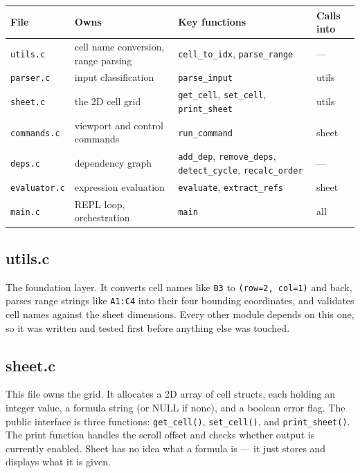 \documentclass[11pt,a4paper]{article}
\begin{document}
\begin{center}
\renewcommand{\arraystretch}{1.3}
\begin{tabular}{llll}
\toprule
\textbf{File} & \textbf{Owns} & \textbf{Key functions} & \textbf{Calls into} \\
\midrule
\texttt{utils.c}     & cell name conversion, range parsing  & \texttt{cell\_to\_idx}, \texttt{parse\_range}       & --- \\
\texttt{parser.c}    & input classification                 & \texttt{parse\_input}                               & utils \\
\texttt{sheet.c}     & the 2D cell grid                     & \texttt{get\_cell}, \texttt{set\_cell}, \texttt{print\_sheet} & utils \\
\texttt{commands.c}  & viewport and control commands        & \texttt{run\_command}                               & sheet \\
\texttt{deps.c}      & dependency graph                     & \texttt{add\_dep}, \texttt{remove\_deps}, \texttt{detect\_cycle}, \texttt{recalc\_order} & --- \\
\texttt{evaluator.c} & expression evaluation                & \texttt{evaluate}, \texttt{extract\_refs}           & sheet \\
\texttt{main.c}      & REPL loop, orchestration             & \texttt{main}                                       & all \\
\bottomrule
\end{tabular}
\end{center}

\subsection{utils.c}

The foundation layer. It converts cell names like \texttt{B3} to \texttt{(row=2, col=1)} and back, parses range strings like \texttt{A1:C4} into their four bounding coordinates, and validates cell names against the sheet dimensions. Every other module depends on this one, so it was written and tested first before anything else was touched.

\subsection{sheet.c}

This file owns the grid. It allocates a 2D array of cell structs, each holding an integer value, a formula string (or NULL if none), and a boolean error flag. The public interface is three functions: \texttt{get\_cell()}, \texttt{set\_cell()}, and \texttt{print\_sheet()}. The print function handles the scroll offset and checks whether output is currently enabled. Sheet has no idea what a formula is --- it just stores and displays what it is given.
\end{document}
